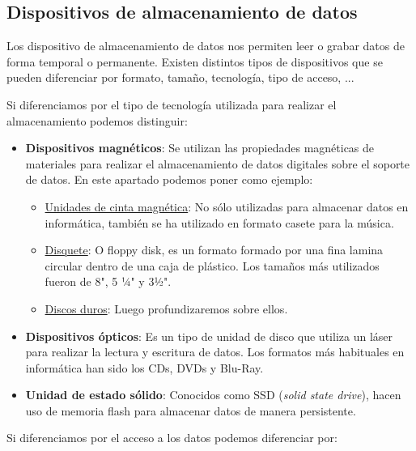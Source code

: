 \hypertarget{dispositivos_almacenamiento}{}
\subsection{Dispositivos de almacenamiento de datos}

Los dispositivo de almacenamiento de datos nos permiten leer o grabar datos de forma temporal o permanente. Existen distintos tipos de dispositivos que se pueden diferenciar por formato, tamaño, tecnología, tipo de acceso, ...

Si diferenciamos por el tipo de tecnología utilizada para realizar el almacenamiento podemos distinguir:

\begin{itemize}
    \item \textbf{Dispositivos magnéticos}: Se utilizan las propiedades magnéticas de materiales para realizar el almacenamiento de datos digitales sobre el soporte de datos. En este apartado podemos poner como ejemplo:
    \begin{itemize}
        \item \href{https://es.wikipedia.org/wiki/Cinta_magn%C3%A9tica_de_almacenamiento_de_datos}{Unidades de cinta magnética}: No sólo utilizadas para almacenar datos en informática, también se ha utilizado en formato casete para la música.
        \hypertarget{disquete}{}
        \item \href{https://es.wikipedia.org/wiki/Disquete}{Disquete}: O floppy disk, es un formato formado por una fina lamina circular dentro de una caja de plástico. Los tamaños más utilizados fueron de 8", 5 ¼" y 3½".
        \item \href{https://es.wikipedia.org/wiki/Unidad_de_disco_duro}{Discos duros}: Luego profundizaremos sobre ellos.
    \end{itemize}

    \item \textbf{Dispositivos ópticos}: Es un tipo de unidad de disco que utiliza un láser para realizar la lectura y escritura de datos. Los formatos más habituales en informática han sido los CDs, DVDs y Blu-Ray.

    \item \textbf{Unidad de estado sólido}: Conocidos como SSD (\textit{solid state drive}), hacen uso de memoria flash para almacenar datos de manera persistente.
\end{itemize}


Si diferenciamos por el acceso a los datos podemos diferenciar por:

